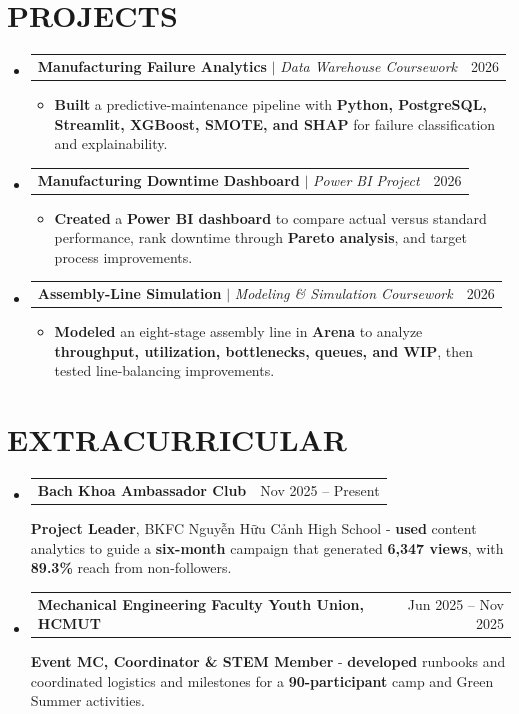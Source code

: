 \documentclass[a4paper,10pt]{article}
\makeatletter
\newcommand{\resumeItem}[1]{\item\small #1}
\newcommand{\resumeProjectHeading}[2]{
  \item
  \begin{tabularx}{\textwidth}[t]{@{}>{\raggedright\arraybackslash}X r@{}}
    \small #1 & \small #2 \\
  \end{tabularx}
}
\newcommand{\resumeActivity}[3]{
  \item
  \begin{tabularx}{\textwidth}[t]{@{}>{\raggedright\arraybackslash}X@{\hspace{1em}}r@{}}
    \small\textbf{#1} & \small #2 \\
  \end{tabularx}
  {\small #3\par}
}
\newcommand{\resumeSubHeadingListStart}{\begin{itemize}[leftmargin=0in,label={},itemsep=4.2pt,topsep=0pt,parsep=0pt,partopsep=0pt]}
\newcommand{\resumeSubHeadingListEnd}{\end{itemize}}
\newcommand{\resumeItemListStart}{\begin{itemize}[leftmargin=0.22in,itemsep=2.1pt,topsep=2.1pt,parsep=0pt,partopsep=0pt]}
\newcommand{\resumeItemListEnd}{\end{itemize}}
\makeatother
\begin{document}
\section{PROJECTS}
\resumeSubHeadingListStart

  \resumeProjectHeading
    {\textbf{Manufacturing Failure Analytics} $|$ \emph{Data Warehouse Coursework}}{2026}
  \resumeItemListStart
    \resumeItem{\textbf{Built} a predictive-maintenance pipeline with \textbf{Python, PostgreSQL, Streamlit, XGBoost, SMOTE, and SHAP} for failure classification and explainability.}
  \resumeItemListEnd

  \resumeProjectHeading
    {\textbf{Manufacturing Downtime Dashboard} $|$ \emph{Power BI Project}}{2026}
  \resumeItemListStart
    \resumeItem{\textbf{Created} a \textbf{Power BI dashboard} to compare actual versus standard performance, rank downtime through \textbf{Pareto analysis}, and target process improvements.}
  \resumeItemListEnd

  \resumeProjectHeading
    {\textbf{Assembly-Line Simulation} $|$ \emph{Modeling \& Simulation Coursework}}{2026}
  \resumeItemListStart
    \resumeItem{\textbf{Modeled} an eight-stage assembly line in \textbf{Arena} to analyze \textbf{throughput, utilization, bottlenecks, queues, and WIP}, then tested line-balancing improvements.}
  \resumeItemListEnd

\resumeSubHeadingListEnd


\section{EXTRACURRICULAR}
\resumeSubHeadingListStart
  \resumeActivity
    {Bach Khoa Ambassador Club}
    {Nov 2025 -- Present}
    {\textbf{Project Leader}, BKFC Nguyễn Hữu Cảnh High School - \textbf{used} content analytics to guide a \textbf{six-month} campaign that generated \textbf{6,347 views}, with \textbf{89.3\%} reach from non-followers.}
  \resumeActivity
    {Mechanical Engineering Faculty Youth Union, HCMUT}
    {Jun 2025 -- Nov 2025}
    {\textbf{Event MC, Coordinator \& STEM Member} - \textbf{developed} runbooks and coordinated logistics and milestones for a \textbf{90-participant} camp and Green Summer activities.}
\resumeSubHeadingListEnd
\end{document}
